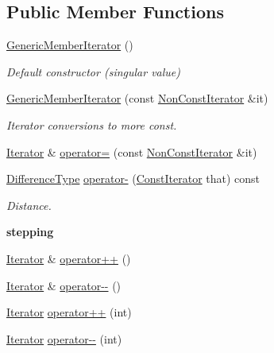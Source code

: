 \subsection*{Public Member Functions}
\begin{DoxyCompactItemize}
\item 
\hyperlink{classGenericMemberIterator_a2708717d497a0aadacdf75900de4c5b4}{Generic\+Member\+Iterator} ()
\begin{DoxyCompactList}\small\item\em Default constructor (singular value) \end{DoxyCompactList}\item 
\hyperlink{classGenericMemberIterator_a2697fd327a90654b0bf91c988e43f95e}{Generic\+Member\+Iterator} (const \hyperlink{classGenericMemberIterator_abc26eb06f2962765b11dcd06ce84ac02}{Non\+Const\+Iterator} \&it)
\begin{DoxyCompactList}\small\item\em Iterator conversions to more const. \end{DoxyCompactList}\item 
\hyperlink{classGenericMemberIterator_ad1cf1ecf6210b47906c9f179c893a8b8}{Iterator} \& \hyperlink{classGenericMemberIterator_a4ebb2b80e7d70c11802520ae77958df3}{operator=} (const \hyperlink{classGenericMemberIterator_abc26eb06f2962765b11dcd06ce84ac02}{Non\+Const\+Iterator} \&it)
\item 
\hyperlink{classGenericMemberIterator_aaa13c83e6e0d1f5b413d62cacd8f6a2e}{Difference\+Type} \hyperlink{classGenericMemberIterator_ae119ae8ed78dbd980f83d367f59a3c94}{operator-\/} (\hyperlink{classGenericMemberIterator_ae5be27a73dce0be58ee2776db896d591}{Const\+Iterator} that) const
\begin{DoxyCompactList}\small\item\em Distance. \end{DoxyCompactList}\end{DoxyCompactItemize}
\begin{Indent}\textbf{ stepping}\par
\begin{DoxyCompactItemize}
\item 
\hyperlink{classGenericMemberIterator_ad1cf1ecf6210b47906c9f179c893a8b8}{Iterator} \& \hyperlink{classGenericMemberIterator_afd6c9a104e2285d1d0b50bde53c9109e}{operator++} ()
\item 
\hyperlink{classGenericMemberIterator_ad1cf1ecf6210b47906c9f179c893a8b8}{Iterator} \& \hyperlink{classGenericMemberIterator_a6db8972f02d74b663b6ef90ee3ff34f6}{operator-\/-\/} ()
\item 
\hyperlink{classGenericMemberIterator_ad1cf1ecf6210b47906c9f179c893a8b8}{Iterator} \hyperlink{classGenericMemberIterator_a83c8be6d960213ce32d68a880a8d9089}{operator++} (int)
\item 
\hyperlink{classGenericMemberIterator_ad1cf1ecf6210b47906c9f179c893a8b8}{Iterator} \hyperlink{classGenericMemberIterator_a4606c8baec5ea2b5139a503f7caa5444}{operator-\/-\/} (int)
\end{DoxyCompactItemize}
\end{Indent}
